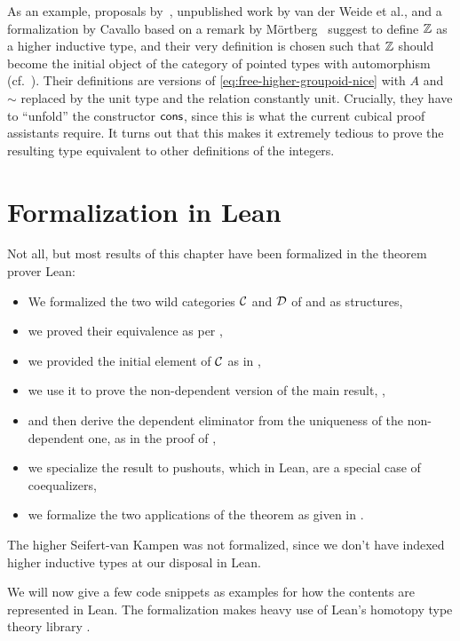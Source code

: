 \begin{remark}
As an example, proposals by~\citet{gun:squid}, unpublished
work by van der Weide et al., and a formalization by Cavallo based on a remark
by M\"ortberg~\citep{Evan:Squid} suggest to define $\mathbb Z$ as a higher inductive
type, and their very definition is chosen such that $\mathbb Z$ should become the
initial object of the category of pointed types with automorphism
(cf.\ ).
Their definitions are versions of \eqref{eq:free-higher-groupoid-nice} with
$A$ and $\sim$ replaced by the unit type and the relation constantly unit.
Crucially, they have to ``unfold'' the constructor $\mathsf{cons}$, since this is
what the current cubical proof assistants require.
It turns out that this makes it extremely tedious to prove the resulting
type equivalent to other definitions of the integers.
\end{remark}

\section{Formalization in Lean}\label{sec:paths-lean}

Not all, but most results of this chapter have been formalized in the
theorem prover Lean:
\begin{itemize}
\item We formalized the two wild categories $\mathcal C$ and $\mathcal D$
of  and  as structures,
\item we proved their equivalence as per ,
\item we provided the initial element of $\mathcal C$ as in ,
\item we use it to prove the non-dependent version of the main result,
,
\item and then derive the dependent eliminator from the uniqueness of
the non-dependent one, as in the proof of ,
\item we specialize the result to pushouts, which in Lean, are a special case of
coequalizers,
\item we formalize the two applications of the theorem as given in
.
\end{itemize}
The higher Seifert-van Kampen was not formalized, since we don't have
indexed higher inductive types at our disposal in Lean.

We will now give a few code snippets as examples for how the contents
are represented in Lean.
The formalization makes heavy use of Lean's homotopy type theory library
\citep{leanhott}.

